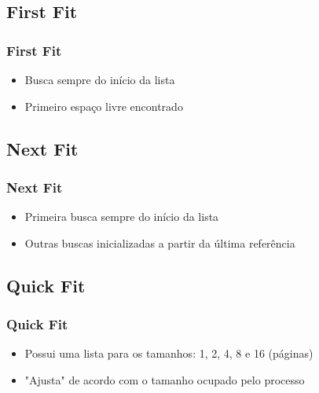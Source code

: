 \documentclass{beamer}
\begin{document}
\subsection{First Fit}
\begin{frame}
\frametitle{First Fit}
\begin{itemize}

\item Busca sempre do início da lista

\item Primeiro espaço livre encontrado
\end{itemize}

\justifying
\end{frame}

\subsection{Next Fit} 

\begin{frame}
\frametitle{Next Fit}
\begin{itemize}

\item Primeira busca sempre do início da lista

\item Outras buscas inicializadas a partir da última 
referência
\end{itemize}
\justifying
\end{frame}

\subsection{Quick Fit}
\begin{frame}
\frametitle{Quick Fit}
\begin{itemize}

\item Possui uma lista para os tamanhos: 1, 2, 4, 8 e 16 (páginas)

\item "Ajusta" de acordo com o tamanho ocupado pelo processo  

\end{itemize}
\justifying
\end{frame}
\end{document}
